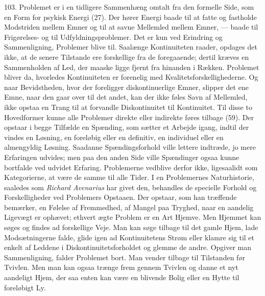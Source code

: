 \documentclass[12pt,a4paper]{book}
\newcommand{\apage}[1]{\marginnote{\footnotesize\textit{[#1]}}}
\begin{document}
103. Problemet er i en tidligere Sammenhæng omtalt fra den formelle Side, som en
Form for psykisk Energi (27). Der hører Energi baade til at fatte og fastholde
Modstriden mellem Emner og til at savne Mellemled mellem Emner, --- baade til
Frigørelses- og til Udfyldningsproblemer. Det er kun ved Erindring og
Sammenligning, Problemer blive til. Saalænge Kontinuiteten raader, opdages det
ikke, at de senere Tilstande ere forskellige fra de foregaaende; dertil kræves en
Sammenholden af Led, der maaske ligge fjernt fra hinanden i Rækken. Problemet
bliver da, hvorledes Kontinuiteten er forenelig med Kvalitetsforskellighederne. Og
naar Bevidstheden, hvor der foreligger diskontinuerlige Emner, slipper det ene
Emne, naar den gaar over til det andet, kan der ikke føles Savn af Mellemled, ikke
opstaa en Trang til at forvandle Diskontinuitet til Kontinuitet. Til disse to
Hovedformer kunne alle Problemer direkte eller indirekte føres tilbage (59). Der
opstaar i begge Tilfælde en Spænding, som sætter et Arbejde igang, indtil der
vindes en Løsning, en foreløbig eller en definitiv, en individuel eller en
almengyldig Løsning. Saadanne Spændingsforhold ville lettere indtræde, jo mere
Erfaringen udvides; men paa den anden Side ville Spændinger ogsaa kunne bortfalde
ved udvidet Erfaring. Problemerne vedblive derfor ikke, ligesaalidt som
Kategorierne, at være de samme til alle Tider. I en Problemernes Naturhistorie,
saaledes som \emph{Richard Avenarius} har givet den, behandles de specielle
Forhold og Forskelligheder ved \apage{247} Problemers Opstaaen. Der opstaar, som han træffende
bemærker, en Følelse af Fremmedhed, af Mangel paa Tryghed, naar en aandelig
Ligevægt er ophævet; ethvert ægte Problem er en Art Hjemve. Men Hjemmet kan søges
og findes ad forskellige Veje. Man kan søge tilbage til det gamle Hjem, lade
Modsætningerne falde, glide igen ad Kontinuitetens Strøm eller klamre sig til et
enkelt af Leddene i Diskontinuitetsforholdet og glemme de andre. Opgiver man
Sammenligning, falder Problemet bort. Man vender tilbage til Tilstanden før
Tvivlen. Men man kan ogsaa trænge frem gennem Tvivlen og danne et nyt aandeligt
Hjem, der saa enten kan være en blivende Bolig eller en Hytte til foreløbigt Ly.
\end{document}
